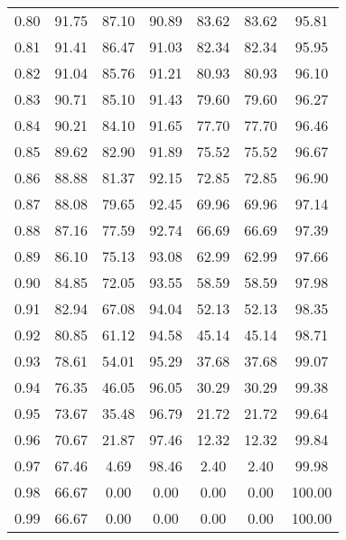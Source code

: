\begin{tabular}{|c|c|c|c|c|c|c|}
      0.80 &     91.75 &     87.10 &      90.89 &   83.62 &      83.62 &         95.81 \\
      0.81 &     91.41 &     86.47 &      91.03 &   82.34 &      82.34 &         95.95 \\
      0.82 &     91.04 &     85.76 &      91.21 &   80.93 &      80.93 &         96.10 \\
      0.83 &     90.71 &     85.10 &      91.43 &   79.60 &      79.60 &         96.27 \\
      0.84 &     90.21 &     84.10 &      91.65 &   77.70 &      77.70 &         96.46 \\
      0.85 &     89.62 &     82.90 &      91.89 &   75.52 &      75.52 &         96.67 \\
      0.86 &     88.88 &     81.37 &      92.15 &   72.85 &      72.85 &         96.90 \\
      0.87 &     88.08 &     79.65 &      92.45 &   69.96 &      69.96 &         97.14 \\
      0.88 &     87.16 &     77.59 &      92.74 &   66.69 &      66.69 &         97.39 \\
      0.89 &     86.10 &     75.13 &      93.08 &   62.99 &      62.99 &         97.66 \\
      0.90 &     84.85 &     72.05 &      93.55 &   58.59 &      58.59 &         97.98 \\
      0.91 &     82.94 &     67.08 &      94.04 &   52.13 &      52.13 &         98.35 \\
      0.92 &     80.85 &     61.12 &      94.58 &   45.14 &      45.14 &         98.71 \\
      0.93 &     78.61 &     54.01 &      95.29 &   37.68 &      37.68 &         99.07 \\
      0.94 &     76.35 &     46.05 &      96.05 &   30.29 &      30.29 &         99.38 \\
      0.95 &     73.67 &     35.48 &      96.79 &   21.72 &      21.72 &         99.64 \\
      0.96 &     70.67 &     21.87 &      97.46 &   12.32 &      12.32 &         99.84 \\
      0.97 &     67.46 &      4.69 &      98.46 &    2.40 &       2.40 &         99.98 \\
      0.98 &     66.67 &      0.00 &       0.00 &    0.00 &       0.00 &        100.00 \\
      0.99 &     66.67 &      0.00 &       0.00 &    0.00 &       0.00 &        100.00 \\
\bottomrule
\end{tabular}
